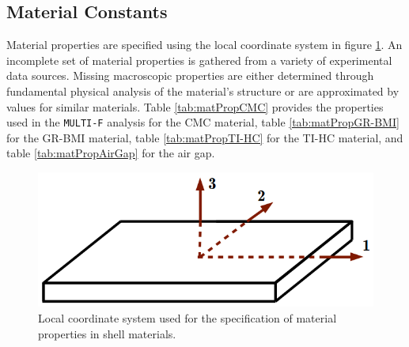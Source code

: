 \documentclass{article}
\begin{document}
\subsection{Material Constants}

Material properties are specified using the local coordinate system in figure \ref{fig:materialCoordinateSystem}. An incomplete set of material properties is gathered from a variety of experimental data sources. Missing macroscopic properties are either determined through fundamental physical analysis of the material's structure or are approximated by values for similar materials. Table \ref{tab:matPropCMC} provides the properties used in the \texttt{MULTI-F} analysis for the CMC material, table \ref{tab:matPropGR-BMI} for the GR-BMI material, table \ref{tab:matPropTI-HC} for the TI-HC material, and table \ref{tab:matPropAirGap} for the air gap.

\begin{figure}
\caption{Local coordinate system used for the specification of material properties in shell materials.}
\label{fig:materialCoordinateSystem}
\begin{center}
\includegraphics[scale=0.3]{figs/material_directions.png}
\end{center}
\end{figure}
\end{document}
